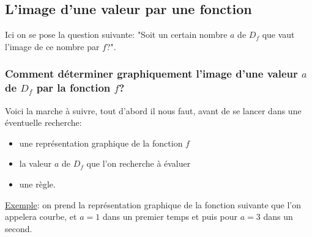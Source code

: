 \documentclass[french]{book}
\begin{document}
\subsection{L'image d'une valeur par une fonction}
Ici on se pose la question suivante: "Soit un certain nombre $a$ de $D_f$ que vaut l'image de ce nombre par $f$?".%


\subsubsection{Comment déterminer graphiquement l'image d'une valeur $a$ de $D_f$ par la fonction $f$?}
Voici la marche à suivre, tout d'abord il nous faut, avant de se lancer dans une éventuelle recherche: 
\begin{itemize}
\item[$\bullet$] {une représentation graphique de la fonction $f$}
\item[$\bullet$]  {la valeur $a$ de $D_f$ que l'on recherche à évaluer}
\item[$\bullet$]  {une règle.}
\end{itemize}

\underline{Exemple}: on prend la représentation graphique de la fonction suivante que l'on appelera courbe, et $a=1$ dans un premier temps et puis pour $a=3$ dans un second.


\begin{center}
\end{center}

\end{document}
